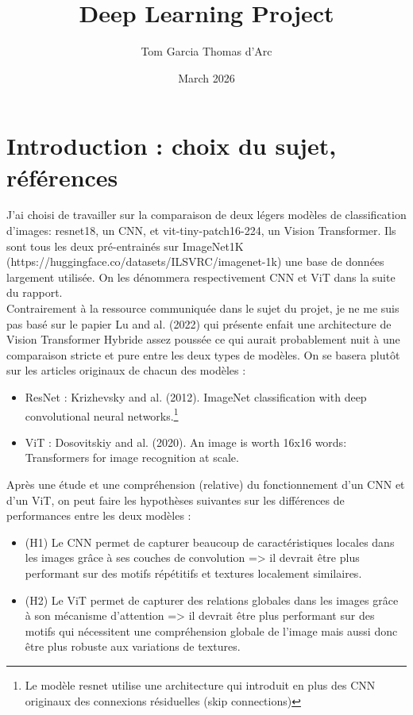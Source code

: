 \documentclass{article}
\title{Deep Learning Project}
\author{Tom Garcia Thomas d'Arc}
\date{March 2026}
\begin{document}
\maketitle

\section{Introduction : choix du sujet, références}
J'ai choisi de travailler sur la comparaison de deux légers modèles de classification d'images: 
resnet18, un CNN, et vit-tiny-patch16-224, un Vision Transformer. 
Ils sont tous les deux pré-entrainés sur ImageNet1K (https://huggingface.co/datasets/ILSVRC/imagenet-1k) une base de données largement utilisée.
On les dénommera respectivement CNN et ViT dans la suite du rapport. \\

Contrairement à la ressource communiquée dans le sujet du projet, je ne me suis pas basé sur le papier Lu and al. (2022) qui présente enfait une architecture de Vision Transformer Hybride assez poussée ce qui aurait probablement nuit à une comparaison stricte et pure entre les deux types de modèles.
On se basera plutôt sur les articles originaux de chacun des modèles :
\begin{itemize}
    \item ResNet : Krizhevsky and al. (2012). ImageNet classification with deep convolutional neural networks.\footnote{Le modèle resnet utilise une architecture qui introduit en plus des CNN originaux des connexions résiduelles (skip connections)}
    \item ViT : Dosovitskiy and al. (2020). An image is worth 16x16 words: Transformers for image recognition at scale. \\
\end{itemize} 

Après une étude et une compréhension (relative) du fonctionnement d'un CNN et d'un ViT, on peut faire les hypothèses suivantes sur les différences de performances entre les deux modèles :
\begin{itemize}
    \item (H1) Le CNN permet de capturer beaucoup de caractéristiques locales dans les images grâce à ses couches de convolution => il devrait être plus performant sur des motifs répétitifs et textures localement similaires.
    \item (H2) Le ViT permet de capturer des relations globales dans les images grâce à son mécanisme d'attention => il devrait être plus performant sur des motifs qui nécessitent une compréhension globale de l'image mais aussi donc être plus robuste aux variations de textures.
\\
\end{itemize}
\end{document}
